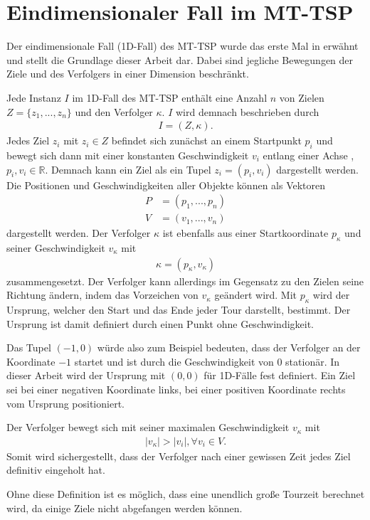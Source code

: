 \documentclass[german,version-2019-11]{uzl-thesis}
\begin{document}
\section{Eindimensionaler Fall im MT-TSP}
Der eindimensionale Fall (1D-Fall) des MT-TSP wurde das erste Mal in \cite{helvig} erwähnt und stellt die Grundlage dieser Arbeit dar. Dabei sind jegliche Bewegungen der Ziele und des Verfolgers in einer Dimension 
beschränkt.
\begin{definition} 
\label{def:Instanz}
Jede Instanz $I$ im 1D-Fall des MT-TSP enthält eine Anzahl $n$ von Zielen \\$Z = \{z_1,...,z_n\}$ und den Verfolger $\kappa$. $I$ wird demnach beschrieben durch
\begin{align*}
I = (Z, \kappa).
\end{align*}
Jedes Ziel $z_i$ mit $z_i\in Z$ befindet sich zunächst an einem Startpunkt $p_i$ und bewegt sich dann mit einer konstanten Geschwindigkeit $v_i$ entlang einer Achse , $p_i, v_i \in\mathbb{R}$. Demnach kann ein Ziel als ein Tupel $z_i = (p_i, v_i)$ dargestellt werden. Die Positionen und Geschwindigkeiten aller Objekte können als Vektoren
\begin{align*}
P &= (p_1, ..., p_n)\\
V &= (v_1, ..., v_n)
\end{align*}\noindent
dargestellt werden. Der Verfolger $\kappa$ ist ebenfalls aus einer Startkoordinate $p_{\kappa}$ und seiner Geschwindigkeit $v_{\kappa}$ mit
\begin{align*}
\kappa = (p_\kappa,v_\kappa)
\end{align*} \noindent
zusammengesetzt. Der Verfolger kann allerdings im Gegensatz zu den Zielen seine Richtung ändern, indem das Vorzeichen von $v_\kappa$ geändert wird. Mit $p_\kappa$ wird der Ursprung, welcher den Start und das Ende jeder Tour darstellt, bestimmt. Der Ursprung ist damit definiert durch einen Punkt ohne Geschwindigkeit.
\end{definition}\noindent
Das Tupel $(-1,0)$ würde also zum Beispiel bedeuten, dass der Verfolger an der Koordinate $-1$ startet und ist durch die Geschwindigkeit von $0$ stationär. In dieser Arbeit wird der Ursprung mit $(0,0)$ für 1D-Fälle fest definiert. Ein Ziel sei bei einer negativen Koordinate links, bei einer positiven Koordinate rechts vom Ursprung positioniert.

\begin{definition}
Der Verfolger bewegt sich mit seiner maximalen Geschwindigkeit $v_{\kappa}$ mit
\begin{align*}
|v_{\kappa}| > |v_i|, \forall v_i\in V.
\end{align*}
Somit wird sichergestellt, dass der Verfolger nach einer gewissen Zeit jedes Ziel definitiv eingeholt hat.
\end{definition} \noindent
Ohne diese Definition ist es möglich, dass eine unendlich große Tourzeit berechnet wird, da einige Ziele nicht abgefangen werden können.
\end{document}
